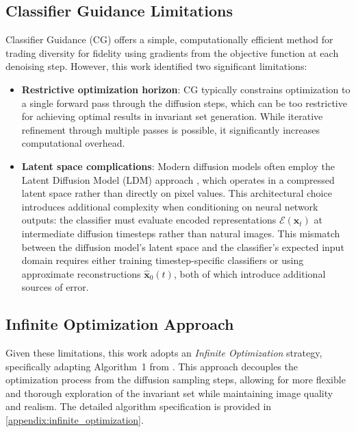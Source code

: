 \documentclass[licencjacka,en]{pracamgr}
\begin{document}
\subsection{Classifier Guidance Limitations}

Classifier Guidance (CG) \citep{dhariwal2021diffusionmodelsbeatgans} offers a simple, computationally efficient method for trading diversity for fidelity using gradients from the objective function at each denoising step. However, this work identified two significant limitations:

\begin{itemize}
  \item \textbf{Restrictive optimization horizon}: CG typically constrains optimization to a single forward pass through the diffusion steps, which can be too restrictive for achieving optimal results in invariant set generation. While iterative refinement through multiple passes is possible, it significantly increases computational overhead.
  
  \item \textbf{Latent space complications}: Modern diffusion models often employ the Latent Diffusion Model (LDM) approach \citep{rombach2022highresolutionimagesynthesislatent}, which operates in a compressed latent space rather than directly on pixel values. This architectural choice introduces additional complexity when conditioning on neural network outputs: the classifier must evaluate encoded representations $\mathcal{E}(\mathbf{x}_t)$ at intermediate diffusion timesteps rather than natural images. This mismatch between the diffusion model's latent space and the classifier's expected input domain requires either training timestep-specific classifiers or using approximate reconstructions $\hat{\mathbf{x}}_0(t)$, both of which introduce additional sources of error.
\end{itemize}

\subsection{Infinite Optimization Approach}

Given these limitations, this work adopts an \textit{Infinite Optimization} strategy, specifically adapting Algorithm~1 from \citep{augustin2024digindiffusionguidanceinvestigating}. This approach decouples the optimization process from the diffusion sampling steps, allowing for more flexible and thorough exploration of the invariant set while maintaining image quality and realism. The detailed algorithm specification is provided in \cref{appendix:infinite_optimization}.
\end{document}
